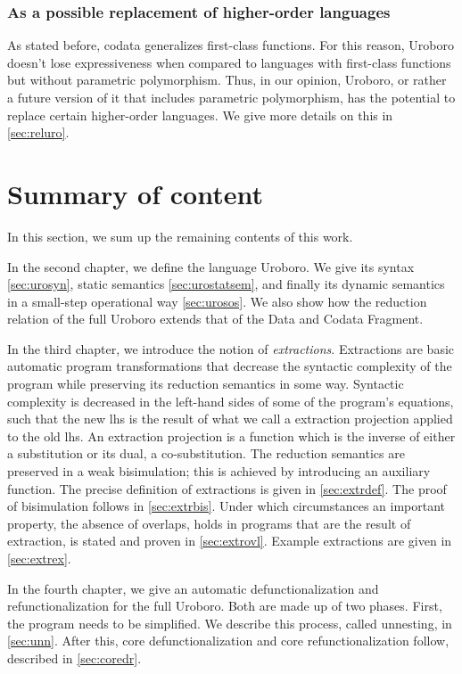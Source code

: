 \subsubsection{As a possible replacement of higher-order languages}

As stated before, codata generalizes first-class functions. For this reason, Uroboro doesn't lose expressiveness when compared to languages with first-class functions but without parametric polymorphism. Thus, in our opinion, Uroboro, or rather a future version of it that includes parametric polymorphism, has the potential to replace certain higher-order languages. We give more details on this in \autoref{sec:reluro}.

\section{Summary of content}
\label{sec:soc}

In this section, we sum up the remaining contents of this work.

In the second chapter, we define the language Uroboro. We give its syntax \autoref{sec:urosyn}, static semantics \autoref{sec:urostatsem}, and finally its dynamic semantics in a small-step operational way \autoref{sec:urosos}. We also show how the reduction relation of the full Uroboro extends that of the Data and Codata Fragment.

In the third chapter, we introduce the notion of \textit{extractions}. Extractions are basic automatic program transformations that decrease the syntactic complexity of the program while preserving its reduction semantics in some way. Syntactic complexity is decreased in the left-hand sides of some of the program's equations, such that the new lhs is the result of what we call a extraction projection applied to the old lhs. An extraction projection is a function which is the inverse of either a substitution or its dual, a co-substitution. The reduction semantics are preserved in a weak bisimulation; this is achieved by introducing an auxiliary function. The precise definition of extractions is given in \autoref{sec:extrdef}. The proof of bisimulation follows in \autoref{sec:extrbis}. Under which circumstances an important property, the absence of overlaps, holds in programs that are the result of extraction, is stated and proven in \autoref{sec:extrovl}. Example extractions are given in \autoref{sec:extrex}.

In the fourth chapter, we give an automatic defunctionalization and refunctionalization for the full Uroboro. Both are made up of two phases. First, the program needs to be simplified. We describe this process, called unnesting, in \autoref{sec:unn}. After this, core defunctionalization and core refunctionalization follow, described in \autoref{sec:coredr}.

